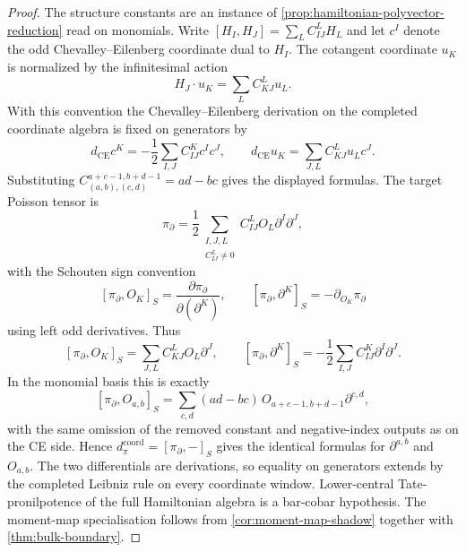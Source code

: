 \documentclass[11pt]{memoir}
\begin{document}
\begin{proof}
  The structure constants are an instance of
  \ref{prop:hamiltonian-polyvector-reduction} read on monomials.
  Write \([H_I,H_J]=\sum_L C^L_{IJ}H_L\) and let
  \(c^I\) denote the odd Chevalley--Eilenberg coordinate dual to
  \(H_I\).  The cotangent coordinate \(u_K\) is normalized by the
  infinitesimal action
  \[
    H_J\cdot u_K=\sum_L C^L_{KJ}u_L .
  \]
  With this convention the Chevalley--Eilenberg derivation on the
  completed coordinate algebra is fixed on generators by
  \[
    d_{\mathrm{CE}}c^K=-\frac12\sum_{I,J}C^K_{IJ}c^Ic^J,
    \qquad
    d_{\mathrm{CE}}u_K=\sum_{J,L}C^L_{KJ}u_Lc^J .
  \]
  Substituting
  \(C^{a+c-1,b+d-1}_{(a,b),(c,d)}=ad-bc\) gives the displayed
  formulas.  The target Poisson tensor is
  \[
    \pi_{\partial}
    =
    \frac12
    \sum_{\substack{I,J,L\\ C^L_{IJ}\neq0}}
    C^L_{IJ}O_L\partial^I\partial^J ,
  \]
  with the Schouten sign convention
  \[
    [\pi_\partial,O_K]_S=
      \frac{\partial\pi_\partial}{\partial(\partial^K)},\qquad
    [\pi_\partial,\partial^K]_S=-\partial_{O_K}\pi_\partial
  \]
  using left odd derivatives.  Thus
  \[
    [\pi_\partial,O_K]_S
    =
    \sum_{J,L} C^L_{KJ}O_L\partial^J,\qquad
    [\pi_\partial,\partial^K]_S
    =
    -\frac12\sum_{I,J} C^K_{IJ}\partial^I\partial^J.
  \]
  In the monomial basis this is exactly
  \[
    [\pi_\partial,O_{a,b}]_S
    =
    \sum_{c,d}(ad-bc)\,
    O_{a+c-1,b+d-1}\partial^{c,d},
  \]
  with the same omission of the removed constant and negative-index
  outputs as on the CE side.  Hence
  \(d_\pi^{\mathrm{coord}}=[\pi_\partial,-]_S\) gives the identical
  formulas for \(\partial^{a,b}\) and \(O_{a,b}\).  The two
  differentials are derivations, so equality on generators extends by
  the completed Leibniz rule on every coordinate window.  Lower-central
  Tate-pronilpotence of the full Hamiltonian algebra is a bar-cobar
  hypothesis. The moment-map specialisation follows from
  \ref{cor:moment-map-shadow} together with \ref{thm:bulk-boundary}.
\end{proof}
\end{document}
